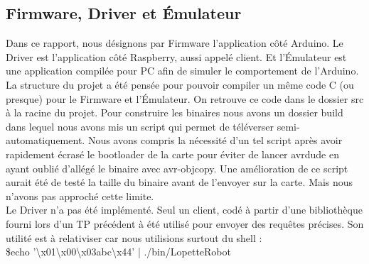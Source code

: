 \subsection{Firmware, Driver et Émulateur}
Dans ce rapport, nous désignons par Firmware l'application côté Arduino. 
Le Driver est l'application côté Raspberry, aussi appelé client. Et l'Émulateur
est une application compilée pour PC afin de simuler le comportement de
l'Arduino.\\

La structure du projet a été pensée pour pouvoir compiler un même code C
(ou presque) pour le Firmware et l'Émulateur. On retrouve ce code dans le
dossier src à la racine du projet. Pour construire les binaires nous avons 
un dossier build dans lequel nous avons mis un script qui permet de 
téléverser semi-automatiquement. Nous avons
compris la nécessité d'un tel script après avoir rapidement écrasé le bootloader
de la carte pour éviter de lancer avrdude en ayant oublié d'allégé le binaire
avec avr-objcopy. Une amélioration de ce script aurait été de testé la taille 
du binaire avant de l'envoyer sur la carte. Mais nous n'avons pas approché
cette limite.\\

Le Driver n'a pas été implémenté. Seul un client, codé à partir d'une bibliothèque
fourni lors d'un TP précédent à été utilisé pour envoyer des requêtes précises.
Son utilité est à relativiser car nous utilisions surtout du shell :\\
\$echo '\textbackslash x01\textbackslash x00\textbackslash x03abc\textbackslash x44' | ./bin/LopetteRobot\\

